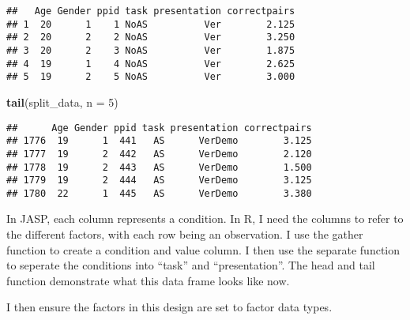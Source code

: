 \documentclass[]{article}
\newenvironment{Shaded}{\begin{snugshade}}{\end{snugshade}}
\newcommand{\KeywordTok}[1]{\textcolor[rgb]{0.13,0.29,0.53}{\textbf{#1}}}
\newcommand{\DataTypeTok}[1]{\textcolor[rgb]{0.13,0.29,0.53}{#1}}
\newcommand{\DecValTok}[1]{\textcolor[rgb]{0.00,0.00,0.81}{#1}}
\newcommand{\StringTok}[1]{\textcolor[rgb]{0.31,0.60,0.02}{#1}}
\newcommand{\CommentTok}[1]{\textcolor[rgb]{0.56,0.35,0.01}{\textit{#1}}}
\newcommand{\OperatorTok}[1]{\textcolor[rgb]{0.81,0.36,0.00}{\textbf{#1}}}
\newcommand{\NormalTok}[1]{#1}
\begin{document}
\begin{verbatim}
##   Age Gender ppid task presentation correctpairs
## 1  20      1    1 NoAS          Ver        2.125
## 2  20      2    2 NoAS          Ver        3.250
## 3  20      2    3 NoAS          Ver        1.875
## 4  19      1    4 NoAS          Ver        2.625
## 5  19      2    5 NoAS          Ver        3.000
\end{verbatim}

\begin{Shaded}
\begin{Highlighting}[]
\KeywordTok{tail}\NormalTok{(split_data, }\DataTypeTok{n =} \DecValTok{5}\NormalTok{)}
\end{Highlighting}
\end{Shaded}

\begin{verbatim}
##      Age Gender ppid task presentation correctpairs
## 1776  19      1  441   AS      VerDemo        3.125
## 1777  19      2  442   AS      VerDemo        2.120
## 1778  19      2  443   AS      VerDemo        1.500
## 1779  19      2  444   AS      VerDemo        3.125
## 1780  22      1  445   AS      VerDemo        3.380
\end{verbatim}

\begin{Shaded}
\end{Shaded}

In JASP, each column represents a condition. In R, I need the columns to
refer to the different factors, with each row being an observation. I
use the gather function to create a condition and value column. I then
use the separate function to seperate the conditions into ``task'' and
``presentation''. The head and tail function demonstrate what this data
frame looks like now.

I then ensure the factors in this design are set to factor data types.
\end{document}
